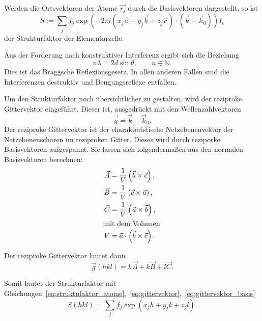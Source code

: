 Werden die Ortsvektoren der Atome $\vec{r_j}$ durch die Basisvektoren dargestellt, so ist
\begin{equation}
  \label{eq:struktufaktor_atome}
  S := \sum_j f_j \exp\left(-2\pi i \left(x_j \vec{a} + y_j \vec{b} + z_j \vec{c}\right) \cdot \left(\vec{k} - \vec{k}_0 \right)\right) I_e
\end{equation}
der Strukturfaktor der Elementarzelle.

Aus der Forderung nach konstruktiver Interferenz ergibt sich die Beziehung
\begin{equation}
  \label{eq:bragg}
  n \lambda = 2 d \sin{\theta}, \hspace{2em} n \in \mathbb{N}.
\end{equation}
Dies ist das Braggsche Reflexionsgesetz.
In allen anderen Fällen sind die Interferenzen destruktiv und Beugungsreflexe entfallen.

Um den Strukturfaktor noch übersichtlicher zu gestalten, wird der reziproke Gittervektor eingeführt.
Dieser ist, ausgedrückt mit den Wellenzahlvektoren
\begin{equation}
  \label{eq:gittervektor}
  \vec{g} = \vec{k} - \vec{k}_0.
\end{equation}
Der reziproke Gittervektor ist der charakteristische Netzebenenvektor der Netzebenenscharen im reziproken Gitter.
Dieses wird durch reziporke Basisvektoren aufgespannt.
Sie lassen sich folgendermaßen aus den normalen Basisvektoren berechnen:
\begin{align}
  \label{eq:reziproke_basisvektoren}
  \vec{A} &= \frac{1}{V} \left(\vec{b} \times \vec{c}\right), \\
  \vec{B} &= \frac{1}{V} \left(\vec{c} \times \vec{a}\right), \\
  \vec{C} &= \frac{1}{V} \left(\vec{a} \times \vec{b}\right), \\
  \intertext{mit dem Volumen}
  V &= \vec{a} \cdot \left(\vec{b} \times \vec{c}\right).
\end{align}

Der reziproke Gittervektor lautet dann
\begin{equation}
  \label{eq:gittervektor_basis}
  \vec{g}(hkl) = h\vec{A} + k\vec{B} + l\vec{C}.
\end{equation}

Somit lautet der Strukturfaktor mit Gleichungen~\eqref{eq:struktufaktor_atome},~\eqref{eq:gittervektor},~\eqref{eq:gittervektor_basis}
\begin{equation}
  S\left(hkl\right) = \sum_j f_j \exp\left(x_j h + y_j k + z_j l\right).
\end{equation}

